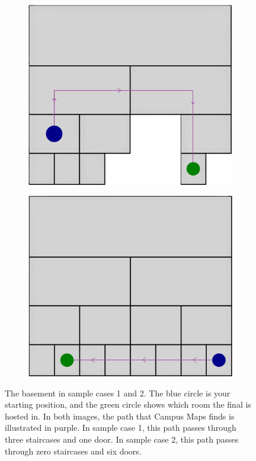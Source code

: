 \begin{centering}
  \begin{figure}[h]
      \centering
      \begin{subfigure}
        \centering
        \includegraphics[scale=0.8]{sample1.png}
      \end{subfigure}
      \begin{subfigure}
        \centering
        \includegraphics[scale=0.8]{sample2.png}
      \end{subfigure}
      \centering
      \caption{The basement in sample cases 1 and 2.
      The blue circle is your starting position, and the green circle shows which room the final is hosted in.
      In both images, the path that Campus Maps finds is illustrated in purple.
      In sample case 1, this path passes through three staircases and one door.
      In sample case 2, this path passes through zero staircases and six doors.
      }
      \label{fig:samples}
  \end{figure}
\end{centering}


